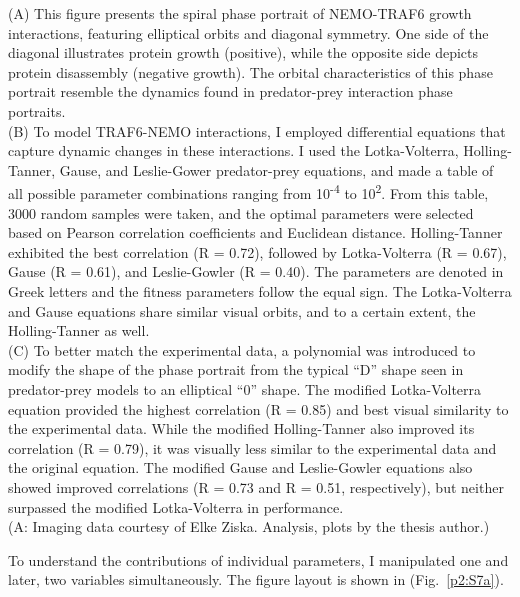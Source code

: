 \begin{centering}
{(A) This figure presents the spiral phase portrait of NEMO-TRAF6 growth interactions, featuring elliptical orbits and diagonal symmetry. One side of the diagonal illustrates protein growth (positive), while the opposite side depicts protein disassembly (negative growth). The orbital characteristics of this phase portrait resemble the dynamics found in predator-prey interaction phase portraits.
\vspace{1em}
\\
(B) To model TRAF6-NEMO interactions, I employed differential equations that capture dynamic changes in these interactions. I used the Lotka-Volterra, Holling-Tanner, Gause, and Leslie-Gower predator-prey equations, and made a table of all possible parameter combinations ranging from 10\textsuperscript{-4} to 10\textsuperscript{2}. From this table, 3000 random samples were taken, and the optimal parameters were selected based on Pearson correlation coefficients and Euclidean distance. Holling-Tanner exhibited the best correlation (R = 0.72), followed by Lotka-Volterra (R = 0.67), Gause (R = 0.61), and Leslie-Gowler (R = 0.40). The parameters are denoted in Greek letters and the fitness parameters follow the equal sign. The Lotka-Volterra and Gause equations share similar visual orbits, and to a certain extent, the Holling-Tanner as well.
\vspace{1em}
\\
(C) To better match the experimental data, a polynomial was introduced to modify the shape of the phase portrait from the typical “D” shape seen in predator-prey models to an elliptical “0” shape. The modified Lotka-Volterra equation provided the highest correlation (R = 0.85) and best visual similarity to the experimental data. While the modified Holling-Tanner also improved its correlation (R = 0.79), it was visually less similar to the experimental data and the original equation. The modified Gause and Leslie-Gowler equations also showed improved correlations (R = 0.73 and R = 0.51, respectively), but neither surpassed the modified Lotka-Volterra in performance.
\vspace{1em}
\\
(A: Imaging data courtesy of Elke Ziska. Analysis, plots by the thesis author.)}
\label{p2:S6}
\end{centering}

To understand the contributions of individual parameters, I manipulated one and later, two variables simultaneously. The figure layout is shown in (Fig.~\ref{p2:S7a}).


